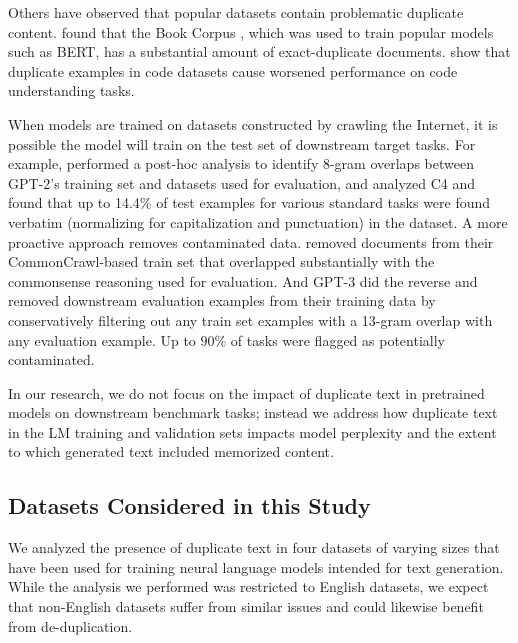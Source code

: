Others have observed that popular datasets contain problematic duplicate content.
\citet{bandy2021addressing} found that the  Book Corpus \citep{zhu2015aligning}, which was used to train popular models such as BERT, has a substantial amount of exact-duplicate documents.
\citet{allamanis2019adverse} show that duplicate examples in code datasets cause worsened performance on code understanding tasks.

When models are trained on datasets constructed by crawling the Internet, it is possible the model will train on the test set of downstream target tasks.
For example, \citet[\S{}4]{radford2019language} performed a post-hoc analysis to identify 8-gram overlaps between GPT-2's training set and datasets used for evaluation,
and \citet{Dodge2021-lb} analyzed C4 and found that up to 14.4\%  of test examples for various standard tasks were found verbatim (normalizing for capitalization and punctuation) in the dataset.
A more proactive approach removes contaminated data.
\citet[Appendix B]{trinh2018simple} removed documents from their CommonCrawl-based train set that overlapped substantially with the commonsense reasoning used for evaluation.
And GPT-3 \cite[\S{}5]{brown2020language} did the reverse and removed downstream evaluation examples from their training data by conservatively filtering out any train set examples with a 13-gram overlap with any evaluation example.
Up to $90\%$ of tasks were flagged as potentially contaminated.

In our research, we do not focus on the impact of duplicate text in pretrained models on downstream benchmark tasks; instead we address how duplicate text in the LM training and validation sets impacts model perplexity and the extent to which generated text included memorized content.


\subsection{Datasets Considered in this Study}
We analyzed the presence of duplicate text in four datasets of varying sizes that have been used for training neural language models intended for text generation.
While the analysis we performed was restricted to English datasets, we expect that non-English datasets suffer from similar issues and could likewise benefit from de-duplication.

